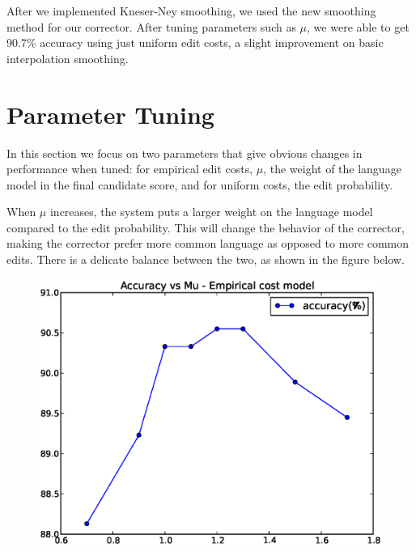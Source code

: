 \documentclass[10pt,twocolumn]{article}
\begin{document}
After we implemented Kneser-Ney smoothing, we used the new smoothing method for our corrector. After tuning parameters such as $\mu$, we were able to get 90.7\% accuracy using just uniform edit costs, a slight improvement on basic interpolation smoothing. 
\section{Parameter Tuning}
In this section we focus on two parameters that give obvious changes in performance when tuned: for empirical edit costs, $\mu$, the weight of the language model in the final candidate score, and for uniform costs, the edit probability.

When $\mu$ increases, the system puts a larger weight on the language model compared to the edit probability. This will change the behavior of the corrector, making the corrector prefer more common language as opposed to more common edits. There is a delicate balance between the two, as shown in the figure below.
\begin{figure}[H]
\includegraphics[width=0.9\linewidth]{mu}
\end{figure}
\end{document}
